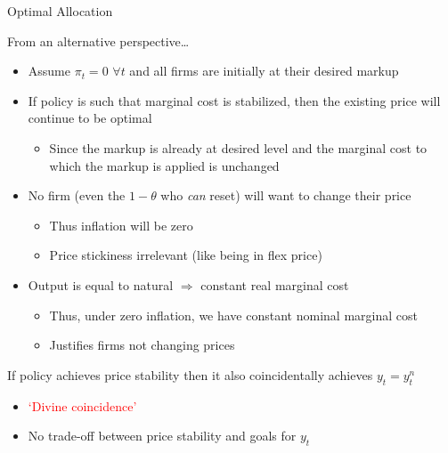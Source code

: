 \begin{frame}{Optimal Allocation}

From an alternative perspective\ldots
\begin{itemize}
\item	Assume $\pi_{t}=0$ $\forall t$ and all firms are initially at their desired markup
\item	If policy is such that marginal cost is stabilized, then the existing price will continue to be optimal
	\begin{itemize}
	\item	Since the markup is already at desired level and the marginal cost to which the markup is applied is unchanged
	\end{itemize}
\item	No firm (even the $1-\theta$ who \emph{can} reset) will want to change their price
	\begin{itemize}
	\item	Thus inflation will be zero
	\item	Price stickiness irrelevant (like being in flex price)
	\end{itemize}
\item	Output is equal to natural $\Rightarrow$ constant real marginal cost
	\begin{itemize}
	\item	Thus, under zero inflation, we have constant nominal marginal cost
	\item	Justifies firms not changing prices
	\end{itemize}
\end{itemize}

\vspace{2mm}
If policy achieves price stability then it also coincidentally achieves $y_{t}=y^{n}_{t}$
\begin{itemize}
\item	\textcolor{red}{`Divine coincidence'}
\item	No trade-off between price stability and goals for $y_{t}$
\end{itemize}

\end{frame}


	
